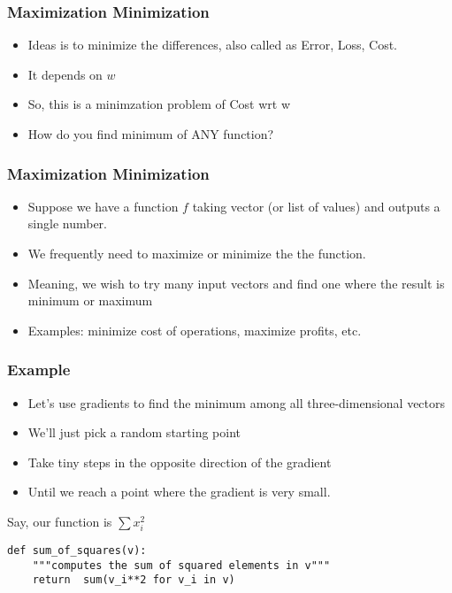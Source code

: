 \begin{frame}[fragile]\frametitle{Maximization Minimization}
\begin{itemize}
\item  Ideas is to minimize the differences, also called as Error, Loss, Cost.
\item It depends on $w$
\item So, this is a minimzation problem of Cost wrt w
\item How do you find minimum of ANY function?
\end{itemize}
\end{frame}


\begin{frame}[fragile]\frametitle{Maximization Minimization}
\begin{itemize}
\item  Suppose we have a function $f$ taking vector (or list of values) and outputs a single number.
\item We frequently need to maximize or minimize the the function.
\item Meaning, we wish to try many input vectors and find one where the result is minimum or maximum
\item Examples: minimize cost of operations, maximize profits, etc.
\end{itemize}
\end{frame}

\begin{frame}[fragile]\frametitle{Example}

\begin{itemize}
\item Let's use gradients to find the minimum among all three-dimensional vectors
\item We'll just pick a random starting point 
\item Take tiny steps in the opposite direction of the gradient 
\item Until we reach a point where the gradient is very small.
\end{itemize}

Say, our function is $\sum x_i ^2$
\begin{lstlisting}
def sum_of_squares(v):
	"""computes	the sum of squared elements in v"""
	return	sum(v_i**2 for v_i in v)
\end{lstlisting}

\end{frame}

